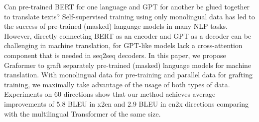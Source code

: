 Can pre-trained BERT for one language and GPT for another be glued together to translate texts? Self-supervised training using only monolingual data has led to the success of pre-trained (masked) language models in many NLP tasks. However, directly connecting BERT as an encoder and GPT as a decoder can be challenging in machine translation, for GPT-like models lack a cross-attention component that is needed in seq2seq decoders. In this paper, we propose Graformer to graft separately pre-trained (masked) language models for machine translation. With monolingual data for pre-training and parallel data for grafting training, we maximally take advantage of the usage of both types of data. Experiments on 60 directions show that our method achieves average improvements of 5.8 BLEU in x2en and 2.9 BLEU in en2x directions comparing with the multilingual Transformer of the same size.
